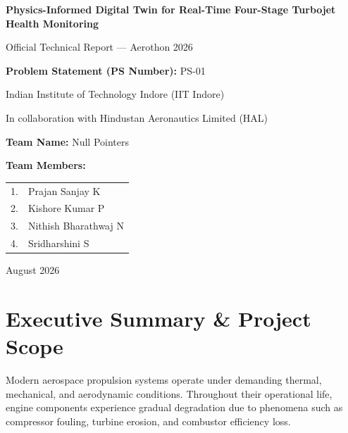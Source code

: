 \documentclass[11pt,a4paper]{article}
\begin{document}
\begin{titlepage}
    \centering
    \vspace*{1cm}
    
    {\Huge \bfseries Physics-Informed Digital Twin for Real-Time Four-Stage Turbojet Health Monitoring\par}
    \vspace{0.5cm}
    {\Large Official Technical Report — Aerothon 2026\par}
    
    \vspace{1.5cm}
    
    {\Large \textbf{Problem Statement (PS Number):} PS-01\par}
    {\large Indian Institute of Technology Indore (IIT Indore)\par}
    {\large In collaboration with Hindustan Aeronautics Limited (HAL)\par}
    
    \vspace{2cm}
    
    {\Large \textbf{Team Name:} Null Pointers\par}
    \vspace{0.5cm}
    {\large \textbf{Team Members:}\par}
    \begin{tabular}{ll}
        1. & Prajan Sanjay K \\
        2. & Kishore Kumar P \\
        3. & Nithish Bharathwaj N \\
        4. & Sridharshini S \\
    \end{tabular}
    
    \vfill
    
    {\large August 2026\par}
\end{titlepage}

\newpage
\tableofcontents
\newpage

\section{Executive Summary \& Project Scope}
Modern aerospace propulsion systems operate under demanding thermal, mechanical, and aerodynamic conditions. Throughout their operational life, engine components experience gradual degradation due to phenomena such as compressor fouling, turbine erosion, and combustor efficiency loss.
\end{document}
